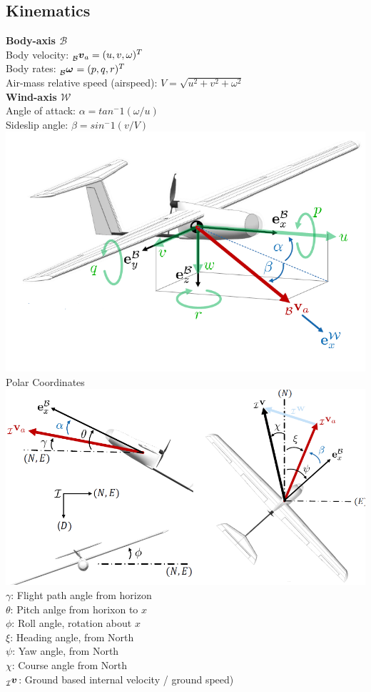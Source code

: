 \documentclass[a4paper, 8pt]{extarticle}
\newcommand{\mvec}[3]{  \prescript{}{\mathcal{#1}}{\bm{#2}}  _{#3} }
\begin{document}
\begin{multicols*}{3}
\subsection{Kinematics}
\textbf{Body-axis $\mathcal{B}$}\\
Body velocity: $\mvec{\mathcal{B}}{v}{a}=(u,v,\omega)^T$\\
Body rates: $\mvec{\mathcal{B}}{\omega}{}=(p,q,r)^T$\\
Air-mass relative speed (airspeed): $V=\sqrt{u^2+v^2+\omega^2}$\\
\textbf{Wind-axis $\mathcal{W}$}\\
Angle of attack: $\alpha=tan^-1(\omega/u)$\\
Sideslip angle: $\beta=sin^-1(v/V)$\\
\includegraphics[width=1\linewidth]{images/FW_KinematicOverview.PNG}
\textrm{Polar Coordinates}\\

\includegraphics[width=1\linewidth]{images/FW_Angles.png}
$\gamma$: Flight path angle from horizon\\
$\theta$: Pitch anlge from horixon to $x$\\
$\phi$: Roll angle, rotation about $x$\\
$\xi$: Heading angle, from North\\
$\psi$: Yaw angle, from North\\
$\chi$: Course angle from North\\
$\mvec{\mathcal{I}}{v}{}$: Ground based internal velocity / ground speed)\\


\end{multicols*}
\end{document}

